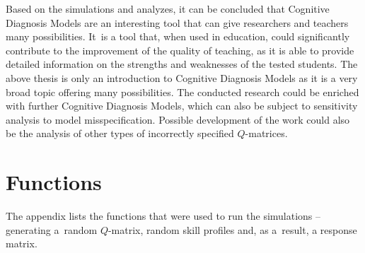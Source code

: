 \documentclass[english]{pwr_wmat_praca_dyplomowa}
\theoremstyle{plain}
\numberwithin{theorem}{chapter}
\theoremstyle{definition}
\numberwithin{theorem}{chapter}
\begin{document}
	Based on the simulations and analyzes, it can be concluded that Cognitive Diagnosis Models are an interesting tool that can give researchers and teachers many possibilities. It~is a tool that, when used in education, could significantly contribute to the improvement of the quality of teaching, as it is able to provide detailed information on the strengths and weaknesses of the tested students. The above thesis is only an introduction to Cognitive Diagnosis Models as it is a very broad topic offering many possibilities. The conducted research could be enriched with further Cognitive Diagnosis Models, which can also be subject to sensitivity analysis to model misspecification. Possible development of the work could also be the analysis of other types of incorrectly specified $Q$-matrices.
	
	
	\appendix
	{\chapter{Functions}}\label{appendix}
	
	\noindent The appendix lists the functions that were used to run the simulations -- generating a~random $Q$-matrix, random skill profiles and, as a~result, a response matrix. \vspace{5pt}
	
\end{document}
